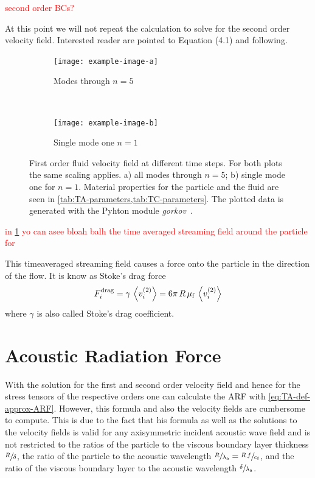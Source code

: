 \textcolor{red}{second order BCs?}

At this point we will not repeat the calculation to solve for the second order 
velocity field. Interested reader are pointed to  
Equation (4.1) and following.

\begin{figure}
  \centering
  \begin{subfigure}[b]{\textwidth}
    \centering
    \caption{Modes through $n=5$}
    \texttt{[image: example-image-a]}
  \end{subfigure}\\%
  \begin{subfigure}[b]{\textwidth}
    \centering
    \caption{Single mode one $n=1$}
    \texttt{[image: example-image-b]}
  \end{subfigure}
  \caption{First order fluid velocity field at different time steps. For both 
  plots the same scaling applies. a) all modes through $n=5$; b) single mode 
one for $n=1$. Material properties for the particle and the fluid are seen in 
\cref{tab:TA-parameters,tab:TC-parameters}. The plotted data is generated with 
the Pyhton module \emph{gorkov}~\cite{pypi}.}
  \label{fig:TA-AS}
\end{figure}

\textcolor{red}{in \cref{fig:TA-AS} yo can asee bloah balh the time averaged 
streaming field around the particle for}

This timeaveraged streaming field causes a force onto the particle in the 
direction of the flow. It is know as Stoke's drag force
\begin{equation}
  F^{\mathrm{drag}}_{i} = \gamma\,\left\langle v_{i}^{(2)} \right\rangle = 
  6\pi\,R\,\mu_{\mathrm{f}}\,\left\langle v_{i}^{(2)} \right\rangle
  \label{eq:TA-drag-force}
\end{equation}
where $\gamma$ is also called Stoke's drag coefficient.


\section{Acoustic Radiation Force\label{sec:TA-ARF}}

With the solution for the first and second order velocity field and hence for 
the stress tensors of the respective orders one can calculate the ARF with 
\cref{eq:TA-def-approx-ARF}. However, this formula and also the velocity fields 
are cumbersome to compute. This is due to the fact that his formula as well as 
the solutions to the velocity fields is valid for any axisymmetric incident 
acoustic wave field and is not restricted to the ratios of the particle to the 
viscous boundary layer thickness $\sfrac{R}{\delta}$, the ratio of the particle 
to the acoustic wavelength $\sfrac{R}{\lambda_{\mathrm{a}}} = 
\sfrac{R\,f}{c_{\mathrm{f}}}$, and the ratio of the viscous boundary layer to the 
acoustic wavelength $\sfrac{\delta}{\lambda_{\mathrm{a}}}$.

